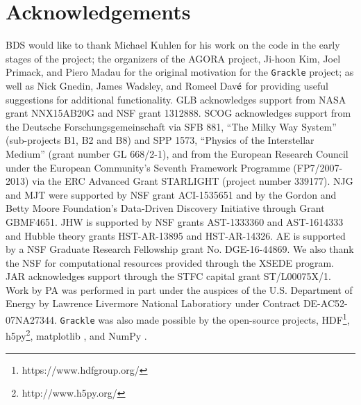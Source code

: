 \section*{Acknowledgements}

BDS would like to thank Michael Kuhlen for his work on the code in the
early stages of the project; the organizers of the AGORA project,
Ji-hoon Kim, Joel Primack, and Piero Madau for the original motivation
for the \texttt{Grackle} project; as well as Nick Gnedin, James
Wadsley, and Romeel Dav$\acute{\rm e}$ for providing useful
suggestions for additional functionality.  GLB acknowledges support
from NASA grant NNX15AB20G and NSF grant 1312888. SCOG acknowledges
support from the Deutsche Forschungsgemeinschaft via SFB 881, ``The
Milky Way System'' (sub-projects B1, B2 and B8) and SPP 1573,
``Physics of the Interstellar Medium'' (grant number GL 668/2-1), and
from the European Research Council under the European Community's
Seventh Framework Programme (FP7/2007-2013) via the ERC Advanced Grant
STARLIGHT (project number 339177).  NJG and MJT were supported by NSF
grant ACI-1535651 and by the Gordon and Betty Moore Foundation's
Data-Driven Discovery Initiative through Grant GBMF4651.  JHW is
supported by NSF grants AST-1333360 and AST-1614333 and Hubble theory
grants HST-AR-13895 and HST-AR-14326.  AE is supported by a NSF
Graduate Research Fellowship grant No. DGE-16-44869. We also thank the
NSF for computational resources provided through the XSEDE
program. JAR acknowledges support through the STFC capital grant
ST/L00075X/1. Work by PA was performed in part under the auspices of
the U.S. Department of Energy by Lawrence Livermore National
Laboratiory under Contract DE-AC52-07NA27344.  \texttt{Grackle} was
also made possible by the open-source projects,
HDF\footnote{https://www.hdfgroup.org/},
h5py\footnote{http://www.h5py.org/}, matplotlib
\citep{2005ASPC..347...91B}, and NumPy \citep{numpy}.

